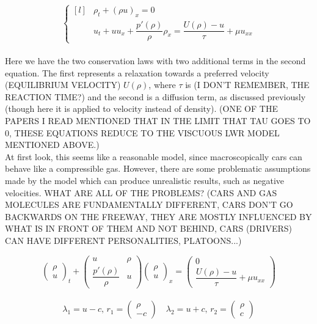 \documentclass{article}
\begin{document}
\[ \left\{ \begin{matrix*}[l] & \rho_t + (\rho u)_x = 0 \\[2ex] & u_t + u u_x + \dfrac{p'(\rho)}{\rho} \rho_x = \dfrac{U(\rho) - u}{
\tau} + \mu u_{xx} \end{matrix*} \right. \] \\

Here we have the two conservation laws with two additional terms in the second equation.  The first represents a relaxation towards a preferred velocity (EQUILIBRIUM VELOCITY) $U(\rho)$, where $\tau$ is (I DON'T REMEMBER, THE REACTION TIME?) and the second is a diffusion term, as discussed previously (though here it is applied to velocity instead of density).  (ONE OF THE PAPERS I READ MENTIONED THAT IN THE LIMIT THAT TAU GOES TO 0, THESE EQUATIONS REDUCE TO THE VISCUOUS LWR MODEL MENTIONED ABOVE.) \\

At first look, this seems like a reasonable model, since macroscopically cars can behave like a compressible gas.  However, there are some problematic assumptions made by the model which can produce unrealistic results, such as negative velocities.  WHAT ARE ALL OF THE PROBLEMS?  (CARS AND GAS MOLECULES ARE FUNDAMENTALLY DIFFERENT, CARS DON'T GO BACKWARDS ON THE FREEWAY, THEY ARE MOSTLY INFLUENCED BY WHAT IS IN FRONT OF THEM AND NOT BEHIND, CARS (DRIVERS) CAN HAVE DIFFERENT PERSONALITIES, PLATOONS...)

\[ \begin{pmatrix} \rho \\[1ex] u \end{pmatrix}_t + \begin{pmatrix} u & \rho \\[1ex] \dfrac{p'(\rho)}{\rho} & u \end{pmatrix} \begin{pmatrix} \rho \\[1ex] u \end{pmatrix}_x = \begin{pmatrix} 0 \\[1ex] \dfrac{U(\rho) - u}{\tau} + \mu u_{xx} \end{pmatrix} \] \\

\[ \lambda_1 = u - c,  \, r_1 = \begin{pmatrix} \rho \\ -c \end{pmatrix} \hspace{1em} \lambda_2 = u + c, \, r_2 = \begin{pmatrix} \rho \\ c \end{pmatrix} \] \\
\end{document}
